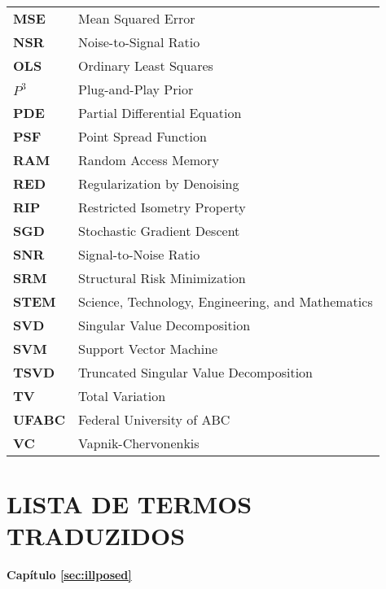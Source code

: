 \begin{flushleft}
\begin{tabular}{ l l }
\textbf{MSE}&Mean Squared Error\\                                                           
\textbf{NSR}&Noise-to-Signal Ratio\\
\textbf{OLS}&Ordinary Least Squares\\                                                     
$P^3$&Plug-and-Play Prior\\                                                                      
\textbf{PDE}& Partial Differential Equation\\                                              
\textbf{PSF}&Point Spread Function\\                                                        
\textbf{RAM}&Random Access Memory\\                                                   
\textbf{RED}&Regularization by Denoising\\                                                   
 \textbf{RIP}&Restricted Isometry Property\\                                              
\textbf{SGD}&Stochastic Gradient Descent\\                                              
\textbf{SNR}&Signal-to-Noise Ratio\\     
\textbf{SRM}&Structural Risk Minimization\\                                              
\textbf{STEM} &  Science, Technology, Engineering, and Mathematics\\
\textbf{SVD}&Singular Value Decomposition\\                                            
\textbf{SVM}&Support Vector Machine\\                                                 
\textbf{TSVD}&Truncated Singular Value Decomposition\\                         
\textbf{TV}&Total Variation\\                                                                     
\textbf{UFABC}&Federal University of ABC\\                                                                     
\textbf{VC}& Vapnik-Chervonenkis \\
\end{tabular}
\end{flushleft}


\newpage
 \section*{\centering LISTA DE TERMOS TRADUZIDOS}
\begin{center}
\textbf{Capítulo \ref{sec:illposed}}
\end{center}

